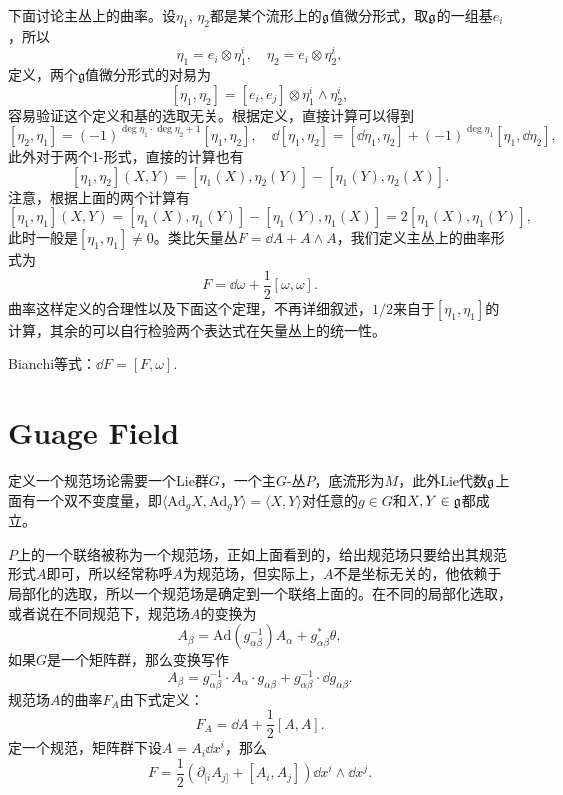 下面讨论主丛上的曲率。设$\eta_1$, $\eta_2$都是某个流形上的${\mathfrak{g}}$值微分形式，取${\mathfrak{g}}$的一组基$e_i$，所以
\[
	\eta_1=e_i\otimes \eta_1^i,\quad \eta_2=e_i\otimes \eta_2^i,
\]
定义，两个$\mathfrak{g}$值微分形式的对易为
\[
	[\eta_1,\eta_2]=[e_i,e_j]\otimes \eta_1^i\wedge\eta_2^i,
\]
容易验证这个定义和基的选取无关。根据定义，直接计算可以得到
\[
	[\eta_2,\eta_1]=(-1)^{\deg \eta_1\cdot \deg \eta_2+1}[\eta_1,\eta_2],\quad \dd[\eta_1,\eta_2]=[\dd\eta_1,\eta_2]+(-1)^{\deg \eta_1}[\eta_1,\dd\eta_2],
\]
此外对于两个1-形式，直接的计算也有
\[
	[\eta_1,\eta_2](X,Y)=[\eta_1(X),\eta_2(Y)]-[\eta_1(Y),\eta_2(X)].
\]
注意，根据上面的两个计算有
\[
	[\eta_1,\eta_1](X,Y)=[\eta_1(X),\eta_1(Y)]-[\eta_1(Y),\eta_1(X)]=2[\eta_1(X),\eta_1(Y)],
\]
此时一般是$[\eta_1,\eta_1]\neq 0$。类比矢量丛$F=\dd A+A\wedge A$，我们定义主丛上的曲率形式为
\[
	F=\dd \omega+\frac{1}{2}[\omega,\omega].
\]
曲率这样定义的合理性以及下面这个定理，不再详细叙述，$1/2$来自于$[\eta_1,\eta_1]$的计算，其余的可以自行检验两个表达式在矢量丛上的统一性。

\para Bianchi等式：$\dd F=[F,\omega]$.


\section{Guage Field}
定义一个规范场论需要一个Lie群$G$，一个主$G$-丛$P$，底流形为$M$，此外Lie代数${\mathfrak{g}}$上面有一个双不变度量，即$\langle \mathrm{Ad}_gX,\mathrm{Ad}_gY\rangle=\langle X,Y\rangle$对任意的$g\in G$和$X,Y\in {\mathfrak{g}}$都成立。

$P$上的一个联络被称为一个规范场，正如上面看到的，给出规范场只要给出其规范形式$A$即可，所以经常称呼$A$为规范场，但实际上，$A$不是坐标无关的，他依赖于局部化的选取，所以一个规范场是确定到一个联络上面的。在不同的局部化选取，或者说在不同规范下，规范场$A$的变换为
\[
	A_\beta=\mathrm{Ad}(g_{\alpha\beta}^{-1})A_\alpha+g_{\alpha\beta}^*\theta,
\]
如果$G$是一个矩阵群，那么变换写作
\[
	A_\beta=g_{\alpha\beta}^{-1}\cdot A_\alpha \cdot g_{\alpha\beta}+g_{\alpha\beta}^{-1}\cdot \dd g_{\alpha\beta}.
\]
规范场$A$的曲率$F_A$由下式定义：
\[
	F_A=\dd A+\frac{1}{2}[A,A].
\]
定一个规范，矩阵群下设$A=A_i\dd x^i$，那么
\[
	F=\frac{1}{2}\left(\partial_{[i}A_{j]}+[A_i,A_j]\right)\dd x^i\wedge \dd x^j.
\]

